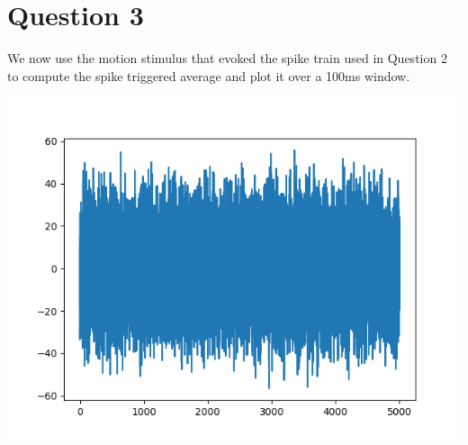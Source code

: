 \documentclass[12pt]{article}
\begin{document}
\section{Question 3}
We now use the motion stimulus that evoked the spike train used in Question 2 to compute the spike triggered average and plot it over a 100ms window.
\begin{center}
\includegraphics[width=1.\textwidth]{sta.png}
\end{center}
\end{document}
